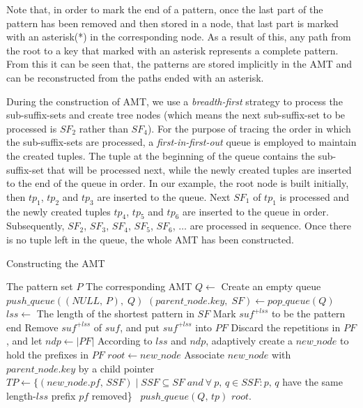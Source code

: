 \documentclass{article}
\begin{document}
Note that, in order to mark the end of a pattern, once the last part
of the pattern has been removed and then stored in a node, that last
part is marked with an asterisk(*) in the corresponding node. As a
result of this, any path from the root to a key that marked with an
asterisk represents a complete pattern. From this it can be seen that,
the patterns are stored implicitly in the AMT and can be reconstructed
from the paths ended with an asterisk.

During the construction of AMT, we use a \emph{breadth-first} strategy
to process the sub-suffix-sets and create tree nodes (which means the
next sub-suffix-set to be processed is $SF_2$ rather than $SF_4$). For
the purpose of tracing the order in which the sub-suffix-sets are
processed, a \emph{first-in-first-out} queue is employed to maintain
the created tuples. The tuple at the beginning of the queue contains
the sub-suffix-set that will be processed next, while the newly
created tuples are inserted to the end of the queue in order. In our
example, the root node is built initially, then $tp_1$, $tp_2$ and
$tp_3$ are inserted to the queue. Next $SF_1$ of $tp_1$ is processed
and the newly created tuples $tp_4$, $tp_5$ and $tp_6$ are inserted to
the queue in order. Subsequently, $SF_2$, $SF_3$, $SF_4$, $SF_5$,
$SF_6$, $\dots$ are processed in sequence. Once there is no tuple left
in the queue, the whole AMT has been constructed.

\begin{algorithm}
  \caption{Constructing the AMT}\scriptsize
  \label{alg:amt}
  \begin{algorithmic}[1]
    \REQUIRE The pattern set $P$
    \ENSURE The corresponding AMT
    \STATE
    \STATE $Q \leftarrow$ Create an empty queue
    \STATE $push\_queue((NULL,\,P),\; Q)$
    \STATE
    \STATE $(parent\_node.key,\; SF) \leftarrow pop\_queue(Q)$
    \STATE $lss \leftarrow$ The length of the shortest pattern in $SF$
    \STATE Mark $suf^{+lss}$ to be the pattern end
    \ENDIF
    \STATE Remove $suf^{+lss}$ of $suf$, and put $suf^{+lss}$ into $PF$
    \ENDFOR
    \STATE Discard the repetitions in $PF$, and let $ndp \leftarrow |PF|$
    \STATE According to $lss$ and $ndp$, adaptively create a
    $new\_node$ to hold the prefixes in
    $PF$
    \STATE $root \leftarrow new\_node$
    \ELSE
    \STATE Associate $new\_node$
    with $parent\_node.key$ by a child pointer
    \ENDIF
    \STATE $TP \leftarrow \{(new\_node.pf,\, SSF) \mid SSF \subseteq SF\; and
    \ \forall \ p,\,q \in SSF: p,\,q$ have the same length-$lss$ prefix
    $pf$ removed\}\
    \STATE $push\_queue(Q,\,tp)$
    \ENDFOR
    \ENDWHILE
    \STATE
    \RETURN $root$.
  \end{algorithmic}
\end{algorithm}
\end{document}
